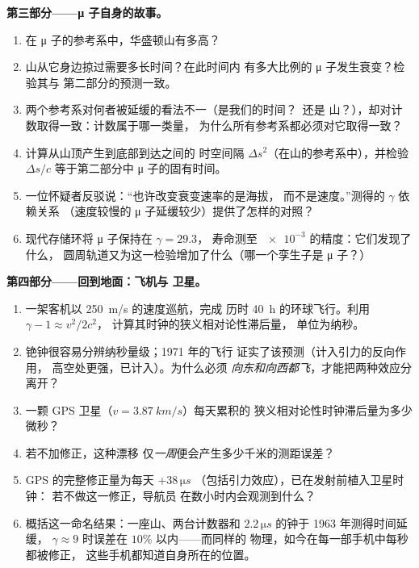 \begin{problem}
\medskip\noindent\textbf{第三部分——μ 子自身的故事。}
\begin{enumerate}[resume]
  \item 在 μ 子的参考系中，华盛顿山有多高？
  \item 山从它身边掠过需要多长时间？在此时间内
        有多大比例的 μ 子发生衰变？检验其与
        第二部分的预测一致。
  \item 两个参考系对何者被延缓的看法不一（是我们的时间？\ 还是
        山？），却对计数取得一致：计数属于哪一类量，
        为什么所有参考系都必须对它取得一致？
  \item 计算从山顶产生到底部到达之间的
        时空间隔 $\Delta s^2$（在山的参考系中），并检验
        $\Delta s/c$ 等于第二部分中 μ 子的固有时间。
  \item 一位怀疑者反驳说：“也许改变衰变速率的是海拔，
        而不是速度。”测得的 $\gamma$ 依赖关系
        （速度较慢的 μ 子延缓较少）提供了怎样的对照？
  \item 现代存储环将 μ 子保持在 $\gamma = 29.3$，
        寿命测至 $\num{e-3}$ 的精度：它们发现了什么，
        圆周轨道又为这一检验增加了什么（哪一个孪生子是
        μ 子？）
\end{enumerate}

\medskip\noindent\textbf{第四部分——回到地面：飞机与
卫星。}
\begin{enumerate}[resume]
  \item 一架客机以 \qty{250}{m/s} 的速度巡航，完成
        历时 \qty{40}{h} 的环球飞行。利用 $\gamma - 1 \approx v^2/2c^2$，
        计算其时钟的狭义相对论性滞后量，
        单位为纳秒。
  \item 铯钟很容易分辨纳秒量级；1971 年的飞行
        证实了该预测（计入引力的反向作用，
        高空处更强，已计入）。为什么必须
        \emph{向东和向西都飞}，才能把两种效应分离开？
  \item 一颗 GPS 卫星（$v = \qty{3.87}{km/s}$）每天累积的
        狭义相对论性时钟滞后量为多少微秒？
  \item 若不加修正，这种漂移
        仅\emph{一周}便会产生多少千米的测距误差？
  \item GPS 的完整修正量为每天 $+38\,\unit{\micro s}$
        （包括引力效应），已在发射前植入卫星时钟：
        若不做这一修正，导航员
        在数小时内会观测到什么？
  \item 概括这一命名结果：一座山、两台计数器和
        $2.2\,\unit{\micro s}$ 的钟于 1963 年测得时间延缓，
        $\gamma \approx 9$ 时误差在 $10\%$ 以内——而同样的
        物理，如今在每一部手机中每秒都被修正，
        这些手机都知道自身所在的位置。
\end{enumerate}
\end{problem}
